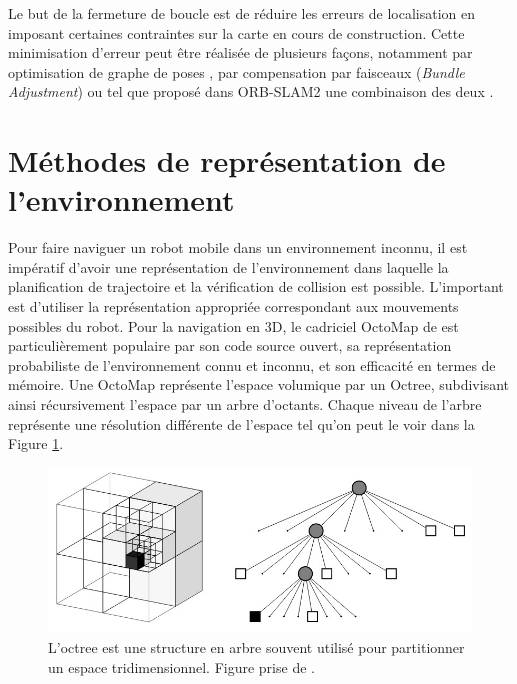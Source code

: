Le but de la fermeture de boucle est de réduire les erreurs de localisation en imposant certaines contraintes sur la carte en cours de construction. Cette minimisation d'erreur peut être réalisée de plusieurs façons, notamment par optimisation de graphe de poses \citep{Carlone2016}, par compensation par faisceaux (\textit{Bundle Adjustment}) \citep{Mei2011} ou tel que proposé dans ORB-SLAM2 une combinaison des deux \citep{Mur-Artal2017}.

\section{Méthodes de représentation de l'environnement}\label{sec:representations}

Pour faire naviguer un robot mobile dans un environnement inconnu, il est impératif d'avoir une représentation de l'environnement dans laquelle la planification de trajectoire et la vérification de collision est possible. L'important est d'utiliser la représentation appropriée correspondant aux mouvements possibles du robot. Pour la navigation en 3D, le cadriciel OctoMap de \cite{Hornung2013} est particulièrement populaire par son code source ouvert, sa représentation probabiliste de l'environnement connu et inconnu, et son efficacité en termes de mémoire. Une OctoMap représente l'espace volumique par un Octree, subdivisant ainsi récursivement l'espace par un arbre d'octants. Chaque niveau de l'arbre représente une résolution différente de l'espace tel qu'on peut le voir dans la Figure \ref{fig:octree}.

\begin{figure}[h]
  \centering
  \includegraphics[width=0.5\linewidth]{images/octree.jpg}
  \caption[Représentation graphique d'une Octree]{L'octree est une structure en arbre souvent utilisé pour partitionner un espace tridimensionnel. Figure prise de \cite{Hornung2013}.}
  \label{fig:octree}
\end{figure}

